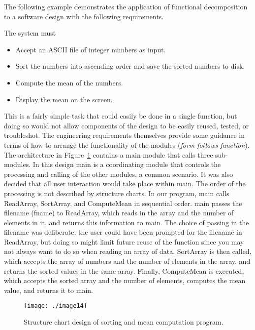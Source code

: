 The following example demonstrates the application of functional
decomposition to a software design with the following requirements.

The system must

\begin{itemize}
\item
  Accept an ASCII file of integer numbers as input.
\item
  Sort the numbers into ascending order and save the sorted numbers to
  disk.
\item
  Compute the mean of the numbers.
\item
  Display the mean on the screen.
\end{itemize}

This is a fairly simple task that could easily be done in a single
function, but doing so would not allow components of the design to be
easily reused, tested, or troubleshot. The engineering requirements
themselves provide some guidance in terms of how to arrange the
functionality of the modules (\emph{form follows function}). The
architecture in 
Figure~\ref{figure:structureChartSorting} contains a main module that calls three
sub-modules. In this design main is a coordinating module that controls
the processing and calling of the other modules, a common scenario. It
was also decided that all user interaction would take place within main.
The order of the processing is not described by structure charts. In our
program, main calls ReadArray, SortArray, and ComputeMean in sequential
order. main passes the filename (fname) to ReadArray, which reads in the
array and the number of elements in it, and returns this information to
main. The choice of passing in the filename was deliberate; the user
could have been prompted for the filename in ReadArray, but doing so
might limit future reuse of the function since you may not always want
to do so when reading an array of data. SortArray is then called, which
accepts the array of numbers and the number of elements in the array,
and returns the sorted values in the same array. Finally, ComputeMean is
executed, which accepts the sorted array and the number of elements,
computes the mean value, and returns it to main.

\begin{figure}
\texttt{[image: ./image14]}
\caption{Structure chart design of sorting and mean
computation program.}
\label{figure:structureChartSorting}
\end{figure}


